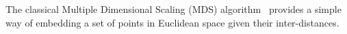 The classical Multiple Dimensional Scaling (MDS) algorithm~\cite{MDS} provides a simple way of embedding a set of points in Euclidean space given their inter-distances. 
%
%
%



